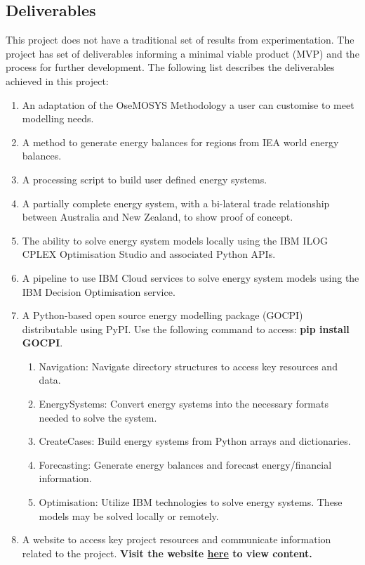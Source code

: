 \documentclass[12pt]{article}
\begin{document}
\subsection{Deliverables}
This project does not have a traditional set of results from experimentation. The project has set of deliverables informing a minimal viable product (MVP) and the process for further development.
The following list describes the deliverables achieved in this project:
\begin{enumerate}
	\item An adaptation of the OseMOSYS Methodology a user can customise to meet modelling needs.
	\item A method to generate energy balances for regions from IEA world energy balances.
	\item A processing script to build user defined energy systems.
	\item A partially complete energy system, with a bi-lateral trade relationship between Australia and New Zealand, to show proof of concept.
	\item The ability to solve energy system models locally using the IBM ILOG CPLEX Optimisation Studio and associated Python APIs.
	\item A pipeline to use IBM Cloud services to solve energy system models using the IBM Decision Optimisation service.
	\item A Python-based open source energy modelling package (GOCPI) distributable using PyPI. Use the following command to access: \textbf{pip install GOCPI}.
	\begin{enumerate}
		\item Navigation: Navigate directory structures to access key resources and data.
		\item EnergySystems: Convert energy systems into the necessary formats needed to solve the system.
		\item CreateCases: Build energy systems from Python arrays and dictionaries.
		\item Forecasting: Generate energy balances and forecast energy/financial information.
		\item Optimisation: Utilize IBM technologies to solve energy systems. These models may be solved locally or remotely.
	\end{enumerate}
		\item A website to access key project resources and communicate information related to the project.
		\textbf{Visit the website \href{https://connormcdowall.com/gocpi.html}{here} to view content.}
\end{enumerate}
\end{document}
